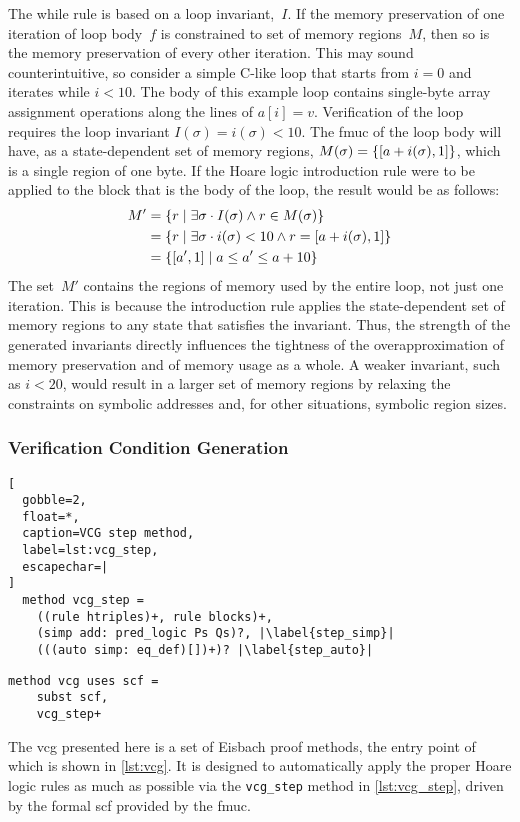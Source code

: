 The while rule is based on a loop invariant,~$I$.
If the memory preservation of one iteration of loop body~$f$
is constrained to set of memory regions~$M$,
then so is the memory preservation of every other iteration.
This may sound counterintuitive,
so consider a simple C-like loop that starts from $i=0$ and iterates while $i<10$.
The body of this example loop contains single-byte array assignment operations
along the lines of $a[i]=v$.
Verification of the loop requires the loop invariant $I(\sigma)=i(\sigma)<10$.
The \ac{fmuc} of the loop body will have, as a state-dependent set of memory regions, $M(\sigma)=\{[a+i(\sigma),1]\}$, which is a single region of one byte.
If the Hoare logic introduction rule were to be applied to the block
that is the body of the loop, the result would be as follows:
\begin{subequations}
  \begin{align}
    M' &= \{r\mid\exists\sigma\cdot I(\sigma)\wedge r\in M(\sigma)\} \\
    &= \{r\mid\exists\sigma\cdot i(\sigma)<10\wedge r=[a+i(\sigma),1]\} \\
    &= \{[a',1]\mid a\leq a'\le a+10\}
  \end{align}
\end{subequations}
The set~$M'$ contains the regions of memory used by the entire loop,
not just one iteration.
This is because the introduction rule applies the state-dependent set of memory regions
to any state that satisfies the invariant.
Thus, the strength of the generated invariants directly influences
the tightness of the overapproximation of memory preservation
and of memory usage as a whole.
A weaker invariant, such as $i<20$, would result in a larger set of memory regions
by relaxing the constraints on symbolic addresses and,
for other situations, symbolic region sizes.

\subsubsection{Verification Condition Generation}\label{sse:vcg}
\begin{lstlisting}[
  gobble=2,
  float=*,
  caption=VCG step method,
  label=lst:vcg_step,
  escapechar=|
]
  method vcg_step =
    ((rule htriples)+, rule blocks)+,
    (simp add: pred_logic Ps Qs)?, |\label{step_simp}|
    (((auto simp: eq_def)[])+)? |\label{step_auto}|
\end{lstlisting}
\begin{lstlisting}[gobble=2, float=*, caption=Main VCG method, label=lst:vcg]
  method vcg uses scf =
    subst scf,
    vcg_step+
\end{lstlisting}
The \ac{vcg} presented here is a set of Eisbach proof methods,
the entry point of which is shown in \cref{lst:vcg}.
It is designed to automatically apply the proper Hoare logic rules
as much as possible via the \lstinline|vcg_step| method in \cref{lst:vcg_step},
driven by the formal \ac{scf} provided by the \ac{fmuc}.

